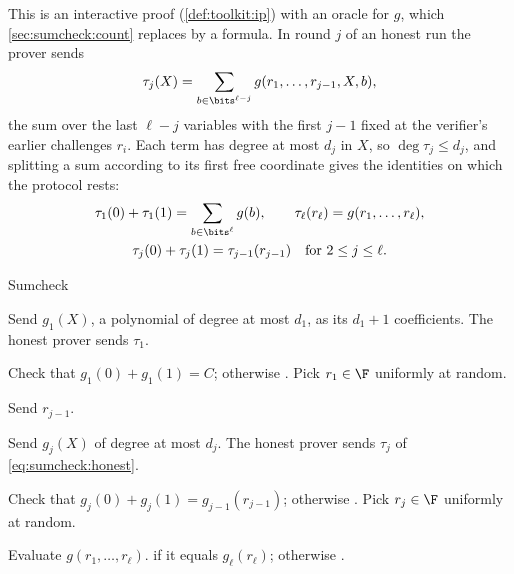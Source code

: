 \begin{refsection}
This is an interactive proof (\cref{def:toolkit:ip}) with an oracle for $g$, which \cref{sec:sumcheck:count} replaces by a formula. In round $j$ of an honest run the prover sends
\begin{equation}\label{eq:sumcheck:honest}
\tau_j(X)=\sum_{b\in\bits^{\ell-j}}g(r_1,\dots,r_{j-1},X,b),
\end{equation}
the sum over the last $\ell-j$ variables with the first $j-1$ fixed at the verifier's earlier challenges $r_i$. Each term has degree at most $d_j$ in $X$, so $\deg\tau_j\le d_j$, and splitting a sum according to its first free coordinate gives the identities on which the protocol rests:
\begin{equation}\label{eq:sumcheck:identities}
\begin{gathered}
\tau_1(0)+\tau_1(1)=\sum_{b\in\bits^\ell}g(b),\qquad\tau_\ell(r_\ell)=g(r_1,\dots,r_\ell),\\
\tau_j(0)+\tau_j(1)=\tau_{j-1}(r_{j-1})\quad\text{for }2\le j\le\ell.
\end{gathered}
\end{equation}

\begin{protocol}{Sumcheck}\label{prot:sumcheck:main}
\item[\msg{P}{V}] Send $g_1(X)$, a polynomial of degree at most $d_1$, as its $d_1+1$ coefficients. The honest prover sends $\tau_1$.
\item[\act{V}] Check that $g_1(0)+g_1(1)=C$; otherwise \rej. Pick $r_1\in\F$ uniformly at random.
\item[\msg{V}{P}] Send $r_{j-1}$.
\item[\msg{P}{V}] Send $g_j(X)$ of degree at most $d_j$. The honest prover sends $\tau_j$ of \eqref{eq:sumcheck:honest}.
\item[\act{V}] Check that $g_j(0)+g_j(1)=g_{j-1}(r_{j-1})$; otherwise \rej. Pick $r_j\in\F$ uniformly at random.
\item[\act{V}] Evaluate $g(r_1,\dots,r_\ell)$. \acc{} if it equals $g_\ell(r_\ell)$; otherwise \rej.
\end{protocol}


\end{refsection}
